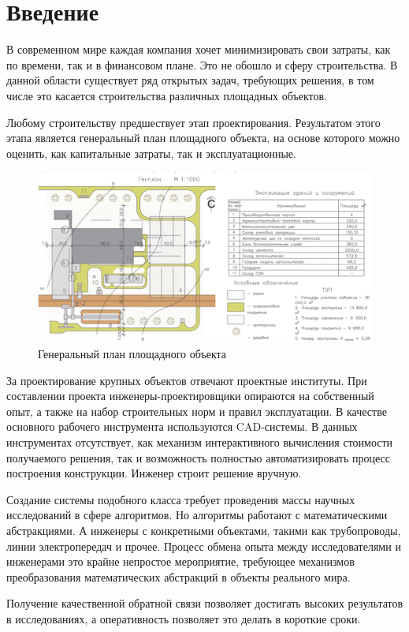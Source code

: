 \chapter*{\Large{Введение}}

В современном мире каждая компания хочет минимизировать свои затраты, как по времени, так и в финансовом плане.
Это не обошло и сферу строительства.
В данной области существует ряд открытых задач, требующих решения,
в том числе это касается строительства различных площадных объектов.

Любому строительству предшествует этап проектирования.
Результатом этого этапа является генеральный план площадного объекта,
на основе которого можно оценить, как капитальные затраты, так и эксплуатационные.

\begin{figure}
    \begin{center}
        \includegraphics[width=\textwidth]{introduction/pictures/site_plan}
    \end{center}
    \caption{Генеральный план площадного объекта}
    \label{pic:problem__site-plan}
\end{figure}

За проектирование крупных объектов отвечают проектные институты.
При составлении проекта инженеры-проектировщики опираются на собственный опыт, а также на набор строительных норм
и правил эксплуатации.
В качестве основного рабочего инструмента используются CAD-системы.
В данных инструментах отсутствует, как механизм интерактивного вычисления стоимости получаемого решения,
так и возможность полностью автоматизировать процесс построения конструкции. Инженер строит решение вручную.


Создание системы подобного класса требует проведения массы научных исследований в сфере алгоритмов.
Но алгоритмы работают с математическими абстракциями.
А инженеры с конкретными объектами, такими как трубопроводы, линии электропередач и прочее.
Процесс обмена опыта между исследователями и инженерами это крайне непростое мероприятие,
требующее механизмов преобразования математических абстракций в объекты реального мира.

Получение качественной обратной связи позволяет достигать высоких результатов в исследованиях, а оперативность
позволяет это делать в короткие сроки.
